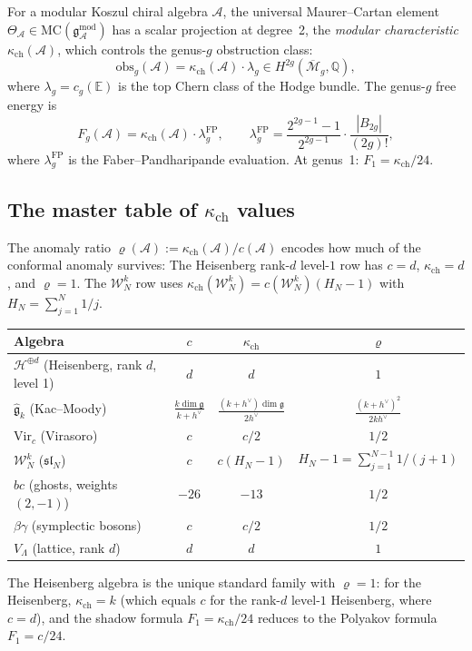 \documentclass[11pt]{article}
\theoremstyle{definition}
\theoremstyle{remark}
\newcommand{\Mbar}{\overline{\mathcal{M}}}
\begin{document}
For a modular Koszul chiral algebra $\mathcal{A}$, the universal
Maurer--Cartan element
$\Theta_\mathcal{A} \in \mathrm{MC}(\mathfrak{g}^{\mathrm{mod}}_\mathcal{A})$
has a scalar projection at degree~2, the \emph{modular characteristic}
$\kappa_{\mathrm{ch}}(\mathcal{A})$, which controls the genus-$g$ obstruction class:
\begin{equation}\label{eq:obs-g}
 \mathrm{obs}_g(\mathcal{A})
 = \kappa_{\mathrm{ch}}(\mathcal{A}) \cdot \lambda_g
 \in H^{2g}(\Mbar_g, \mathbb{Q}),
\end{equation}
where $\lambda_g = c_g(\mathbb{E})$ is the top Chern class of the Hodge
bundle. The genus-$g$ free energy is
\begin{equation}\label{eq:Fg}
 F_g(\mathcal{A})
 = \kappa_{\mathrm{ch}}(\mathcal{A}) \cdot \lambda_g^{\mathrm{FP}},
 \qquad
 \lambda_g^{\mathrm{FP}}
 = \frac{2^{2g-1}-1}{2^{2g-1}} \cdot \frac{|B_{2g}|}{(2g)!},
\end{equation}
where $\lambda_g^{\mathrm{FP}}$ is the Faber--Pandharipande evaluation.
At genus~1: $F_1 = \kappa_{\mathrm{ch}}/24$.

\subsection{The master table of $\kappa_{\mathrm{ch}}$ values}

The anomaly ratio $\varrho(\mathcal{A}) := \kappa_{\mathrm{ch}}(\mathcal{A})/c(\mathcal{A})$
encodes how much of the conformal anomaly survives:
The Heisenberg rank-$d$ level-$1$ row has $c=d$,
$\kappa_{\mathrm{ch}}=d$, and $\varrho=1$. The $\mathcal{W}_N^k$ row uses
$\kappa_{\mathrm{ch}}(\mathcal{W}_N^k)=c(\mathcal{W}_N^k)(H_N-1)$ with
$H_N=\sum_{j=1}^N 1/j$.
\begin{center}
\begin{tabular}{lccc}
\textbf{Algebra} & $c$ & $\kappa_{\mathrm{ch}}$ & $\varrho$ \\ \hline
$\mathcal{H}^{\oplus d}$ (Heisenberg, rank $d$, level 1) & $d$ & $d$ & $1$ \\
$\widehat{\mathfrak{g}}_k$ (Kac--Moody) &
 $\frac{k \dim\mathfrak{g}}{k+h^\vee}$ &
 $\frac{(k+h^\vee)\dim\mathfrak{g}}{2h^\vee}$ &
 $\frac{(k+h^\vee)^2}{2kh^\vee}$ \\
$\mathrm{Vir}_c$ (Virasoro) & $c$ & $c/2$ & $1/2$ \\
$\mathcal{W}_N^k$ ($\mathfrak{sl}_N$) & $c$ & $c(H_N - 1)$ &
 $H_N - 1 = \sum_{j=1}^{N-1} 1/(j+1)$ \\
$bc$ (ghosts, weights $(2,-1)$) & $-26$ & $-13$ & $1/2$ \\
$\beta\gamma$ (symplectic bosons) & $c$ & $c/2$ & $1/2$ \\
$V_\Lambda$ (lattice, rank $d$) & $d$ & $d$ & $1$
\end{tabular}
\end{center}
The Heisenberg algebra is the unique standard family with $\varrho = 1$:
for the Heisenberg, $\kappa_{\mathrm{ch}} = k$ (which equals $c$ for the rank-$d$ level-$1$ Heisenberg, where $c = d$), and the shadow formula $F_1 = \kappa_{\mathrm{ch}}/24$
reduces to the Polyakov formula $F_1 = c/24$.
\end{document}
